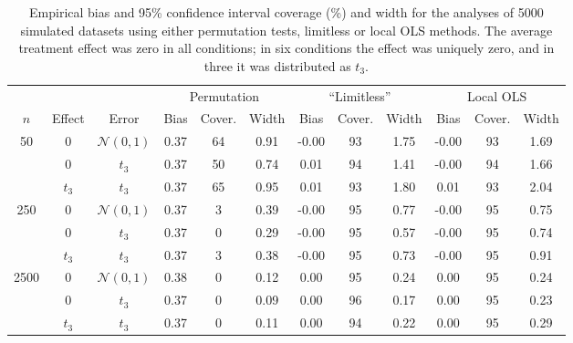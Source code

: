 
\begin{table}
\footnotesize
\begin{tabular}{ccc|ccc|ccc|ccc}
\hline

&&& \multicolumn{ 3 }{c}{Permutation}&\multicolumn{ 3 }{c}{``Limitless''}&\multicolumn{ 3 }{c}{Local OLS}\\
$n$& Effect& Error & Bias&Cover.&Width&Bias&Cover.&Width&Bias&Cover.&Width \\
\hline
\hline
\multirow{3}{*}{ 50 } &0& $\mathcal{N}(0,1)$ &0.37&64&0.91&-0.00&93&1.75&-0.00&93&1.69 \\
 &  0 & $t_3$ &0.37&50&0.74&0.01&94&1.41&-0.00&94&1.66 \\
 &  $t_3$ & $t_3$ &0.37&65&0.95&0.01&93&1.80&0.01&93&2.04 \\
\hline
\multirow{3}{*}{ 250 } &0& $\mathcal{N}(0,1)$ &0.37&3&0.39&-0.00&95&0.77&-0.00&95&0.75 \\
 &  0 & $t_3$ &0.37&0&0.29&-0.00&95&0.57&-0.00&95&0.74 \\
 &  $t_3$ & $t_3$ &0.37&3&0.38&-0.00&95&0.73&-0.00&95&0.91 \\
\hline
\multirow{3}{*}{ 2500 } &0& $\mathcal{N}(0,1)$ &0.38&0&0.12&0.00&95&0.24&0.00&95&0.24 \\
 &  0 & $t_3$ &0.37&0&0.09&0.00&96&0.17&0.00&95&0.23 \\
 &  $t_3$ & $t_3$ &0.37&0&0.11&0.00&94&0.22&0.00&95&0.29 \\
\hline
\end{tabular}
  \caption{Empirical bias and 95\% confidence interval coverage (\%) and width for the analyses of  5000 simulated datasets using either permutation tests, limitless or local OLS methods. The average treatment effect was zero in all conditions; in six conditions the effect was uniquely zero, and in three it was distributed as $t_3$.}
  \label{tab:level}
\end{table}
